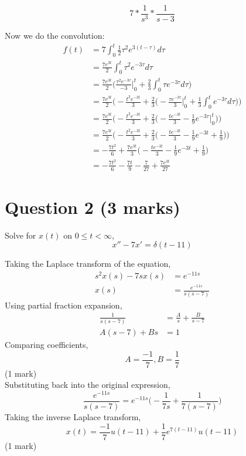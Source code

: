\documentclass[12pt]{article}
\begin{document}
$$7 * \frac{1}{s^3} * \frac{1}{s-3}$$

\noindent Now we do the convolution:
\begin{align*}
    f(t) &= 7 \int_0^{t} \frac{1}{2}\tau^2e^{3(t - \tau)} d\tau \tag{1 mark}
      \\ &= \frac{7e^{3t}}{2} \int_0^t \tau^2e^{-3\tau} d\tau
      \\ &= \frac{7e^{3t}}{2}
        \bigg(\frac{\tau^2e^{-3\tau}}{-3} \bigg|_0^t
        + \frac{2}{3} \int_0^t \tau e^{-3\tau} d\tau \bigg)
      \\ &= \frac{7e^{3t}}{2} \bigg(-\frac{t^2e^{-3t}}{3}
        + \frac{2}{3} \bigg(-\frac{\tau e^{-3\tau}}{3} \bigg|_0^t
        + \frac{1}{3} \int_0^t e^{-3\tau} d\tau \bigg) \bigg)
      \\ &= \frac{7e^{3t}}{2} \bigg(-\frac{t^2e^{-3t}}{3}
        + \frac{2}{3} \bigg(-\frac{te^{-3t}}{3}
        - \frac{1}{9} e^{-3\tau} \bigg|_0^t \bigg) \bigg)
      \\ &= \frac{7e^{3t}}{2} \bigg(-\frac{t^2e^{-3t}}{3}
        + \frac{2}{3} \bigg(-\frac{te^{-3t}}{3}
        - \frac{1}{9} e^{-3t} + \frac{1}{9} \bigg) \bigg)
      \\ &= -\frac{7t^2}{6}
        + \frac{7e^{3t}}{3} \bigg(-\frac{te^{-3t}}{3}
        - \frac{1}{9} e^{-3t} + \frac{1}{9} \bigg) \tag{1 mark for solving integration}
      \\ &= -\frac{7t^2}{6} -\frac{7t}{9}
        - \frac{7}{27} + \frac{7e^{3t}}{27} \tag{1 mark}
\end{align*}

\section*{Question 2 (3 marks)}
Solve for $x(t)$ on $0 \leq t < \infty$, $$x''-7x'=\delta(t-11)$$

\noindent Taking the Laplace transform of the equation,
\begin{align*}
  s^2x(s) - 7sx(s) &= e^{-11s} \\
  x(s) &= \frac{e^{-11s}}{s(s-7)} \tag{1 mark}
\end{align*}
Using partial fraction expansion,
\begin{align*}
  \frac{1}{s(s-7)} &= \frac{A}{s} + \frac{B}{s-7} \\
  A(s-7) + Bs &= 1
\end{align*}
Comparing coefficients, $$A=\frac{-1}{7}, B=\frac{1}{7}$$\hfill(1 mark) \\ Substituting back into the original expression, $$\frac{e^{-11s}}{s(s-7)} = e^{-11s}\bigg(-\frac{1}{7s} + \frac{1}{7(s-7)}\bigg)$$ Taking the inverse Laplace transform, $$x(t)=\frac{-1}{7}u(t-11) + \frac{1}{7}e^{7(t-11)}u(t-11)$$\hfill(1 mark)
\end{document}
